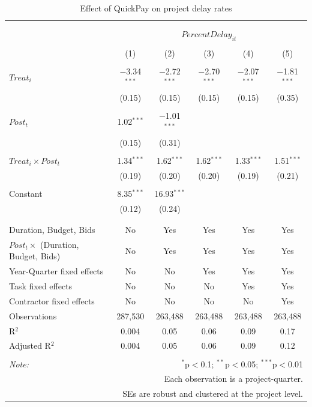 \documentclass[
]{article}
\begin{document}
\begin{table}[H] \centering 
  \caption{Effect of QuickPay on project delay rates} 
  \label{} 
\small 
\begin{tabular}{@{\extracolsep{-2pt}}lccccc} 
\\[-1.8ex]\hline 
\hline \\[-1.8ex] 
\\[-1.8ex] & \multicolumn{5}{c}{$PercentDelay_{it}$} \\ 
\\[-1.8ex] & (1) & (2) & (3) & (4) & (5)\\ 
\hline \\[-1.8ex] 
 $Treat_i$ & $-$3.34$^{***}$ & $-$2.72$^{***}$ & $-$2.70$^{***}$ & $-$2.07$^{***}$ & $-$1.81$^{***}$ \\ 
  & (0.15) & (0.15) & (0.15) & (0.15) & (0.35) \\ 
  & & & & & \\ 
 $Post_t$ & 1.02$^{***}$ & $-$1.01$^{***}$ &  &  &  \\ 
  & (0.15) & (0.31) &  &  &  \\ 
  & & & & & \\ 
 $Treat_i \times Post_t$ & 1.34$^{***}$ & 1.62$^{***}$ & 1.62$^{***}$ & 1.33$^{***}$ & 1.51$^{***}$ \\ 
  & (0.19) & (0.20) & (0.20) & (0.19) & (0.21) \\ 
  & & & & & \\ 
 Constant & 8.35$^{***}$ & 16.93$^{***}$ &  &  &  \\ 
  & (0.12) & (0.24) &  &  &  \\ 
  & & & & & \\ 
\hline \\[-1.8ex] 
Duration, Budget, Bids & No & Yes & Yes & Yes & Yes \\ 
$Post_t \times$  (Duration, Budget, Bids) & No & Yes & Yes & Yes & Yes \\ 
Year-Quarter fixed effects & No & No & Yes & Yes & Yes \\ 
Task fixed effects & No & No & No & Yes & Yes \\ 
Contractor fixed effects & No & No & No & No & Yes \\ 
Observations & 287,530 & 263,488 & 263,488 & 263,488 & 263,488 \\ 
R$^{2}$ & 0.004 & 0.05 & 0.06 & 0.09 & 0.17 \\ 
Adjusted R$^{2}$ & 0.004 & 0.05 & 0.06 & 0.09 & 0.12 \\ 
\hline 
\hline \\[-1.8ex] 
\textit{Note:}  & \multicolumn{5}{r}{$^{*}$p$<$0.1; $^{**}$p$<$0.05; $^{***}$p$<$0.01} \\ 
 & \multicolumn{5}{r}{Each observation is a project-quarter.} \\ 
 & \multicolumn{5}{r}{SEs are robust and clustered at the project level.} \\ 
\end{tabular} 
\end{table}
\end{document}
